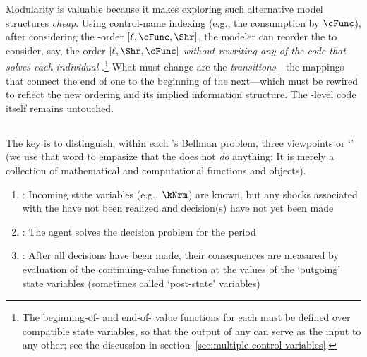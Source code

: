 
Modularity is valuable because it makes exploring such alternative model structures \textit{cheap}.  Using control-name indexing (e.g., the consumption {\stg} by $\cFunc$), after considering the {\stg}-order $[\ell,\cFunc,\Shr]$, the modeler can reorder the {\stgs} to consider, say, the order $[\ell,\Shr,\cFunc]$ \textit{without rewriting any of the code that solves each individual {\stg}}.\footnote{The beginning-of-{\stg} and end-of-{\stg} value functions for each {\stg} must be defined over compatible state variables, so that the output of any {\stg} can serve as the input to any other; see the discussion in section~\ref{sec:multiple-control-variables}.
}  What must change are the \textit{transitions}---the mappings that connect the end of one {\stg} to the beginning of the next---which must be rewired to reflect the new ordering and its implied information structure.  The {\stg}-level code itself remains untouched.

\hypertarget{prchs}{}
\subsection{\Prchs}\label{subsec:prchs}

The key is to distinguish, within each {\stg}'s Bellman problem, three viewpoints or `{\prchs}' (we use that word to empasize that the {\prch} does not \textit{do} anything: It is merely a collection of mathematical and computational functions and objects).
\begin{enumerate}
\item \textbf{\Arrival}: Incoming state variables (e.g., $\kNrm$) are known, but any shocks associated with the {\stg} have not been realized and decision(s) have not yet been made
\item \textbf{\Decision}: The agent solves the decision problem for the period
\item \textbf{\Continuation}: After all decisions have been made, their consequences are measured by evaluation of the continuing-value function at the values of the `outgoing' state variables (sometimes called `post-state' variables)
\end{enumerate}

